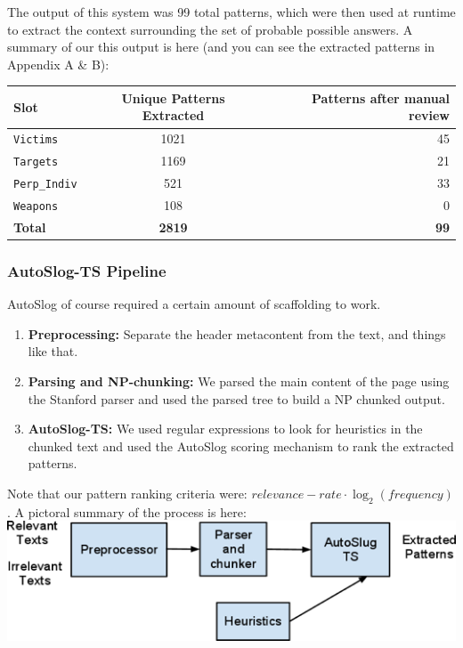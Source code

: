 \documentclass[11pt]{myclass}
\begin{document}
The output of this system was 99 total patterns, which were then used at runtime to extract the context surrounding the set of probable possible answers. A summary of our this output is here (and you can see the extracted patterns in Appendix A \& B): \\

\begin{tabular}{| l | c | r |}
  \hline
  \textbf{Slot} & \textbf{Unique Patterns Extracted} & \textbf{Patterns after manual review} \\
  \hline
  \hline
  \texttt{Victims} & 1021 & 45 \\
  \hline
  \texttt{Targets} & 1169 & 21 \\
  \hline
  \texttt{Perp\_Indiv} & 521 & 33 \\
  \hline
  \texttt{Weapons} & 108 & 0 \\
  \hline
  \hline
  \textbf{Total} & \textbf{2819} & \textbf{99} \\
  \hline
\end{tabular}

\subsubsection{AutoSlog-TS Pipeline}

AutoSlog of course required a certain amount of scaffolding to work.

\begin{enumerate}

\item \textbf{Preprocessing:} Separate the header metacontent from the text, and things like that.

\item \textbf{Parsing and NP-chunking:} We parsed the main content of the page using the Stanford parser and used the parsed tree to build a NP chunked output.

\item \textbf{AutoSlog-TS:} We used regular expressions to look for heuristics in the chunked text and used the AutoSlog scoring mechanism to rank the extracted patterns.

\end{enumerate}

Note that our pattern ranking criteria were: $relevance-rate \cdot \log_2(frequency)$. A pictoral summary of the process is here: \\

\includegraphics[scale=0.75]{workflow.png}
\end{document}
